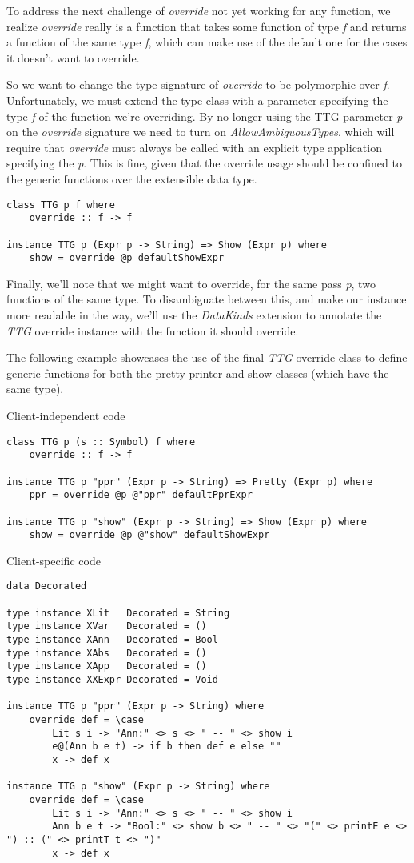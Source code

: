 \documentclass{article}
\begin{document}
To address the next challenge of \emph{override} not yet working for any
function, we realize \emph{override} really is a function that takes some
function of type \emph{f} and returns a function of the same type \emph{f},
which can make use of the default one for the cases it doesn't want to override.

So we want to change the type signature of \emph{override} to be polymorphic
over \emph{f}. Unfortunately, we must extend the type-class with a parameter
specifying the type \emph{f} of the function we're overriding. By no longer
using the TTG parameter \emph{p} on the \emph{override} signature we need to
turn on \emph{AllowAmbiguousTypes}, which will require that \emph{override}
must always be called with an explicit type application specifying the \emph{p}.
This is fine, given that the override usage should be confined to the generic
functions over the extensible data type.

\begin{lstlisting}
class TTG p f where
    override :: f -> f

instance TTG p (Expr p -> String) => Show (Expr p) where
    show = override @p defaultShowExpr
\end{lstlisting}

Finally, we'll note that we might want to override, for the same pass \emph{p},
two functions of the same type. To disambiguate between this, and make our
instance more readable in the way, we'll use the \emph{DataKinds} extension to
annotate the \emph{TTG} override instance with the function it should override.

The following example showcases the use of the final \emph{TTG} override class
to define generic functions for both the pretty printer and show classes (which
have the same type).

Client-independent code
\begin{lstlisting}
class TTG p (s :: Symbol) f where
    override :: f -> f

instance TTG p "ppr" (Expr p -> String) => Pretty (Expr p) where
    ppr = override @p @"ppr" defaultPprExpr

instance TTG p "show" (Expr p -> String) => Show (Expr p) where
    show = override @p @"show" defaultShowExpr
\end{lstlisting}

Client-specific code
\begin{lstlisting}
data Decorated

type instance XLit   Decorated = String
type instance XVar   Decorated = ()
type instance XAnn   Decorated = Bool
type instance XAbs   Decorated = ()
type instance XApp   Decorated = ()
type instance XXExpr Decorated = Void

instance TTG p "ppr" (Expr p -> String) where
    override def = \case
        Lit s i -> "Ann:" <> s <> " -- " <> show i
        e@(Ann b e t) -> if b then def e else ""
        x -> def x

instance TTG p "show" (Expr p -> String) where
    override def = \case
        Lit s i -> "Ann:" <> s <> " -- " <> show i
        Ann b e t -> "Bool:" <> show b <> " -- " <> "(" <> printE e <> ") :: (" <> printT t <> ")"
        x -> def x
\end{lstlisting}
\end{document}

